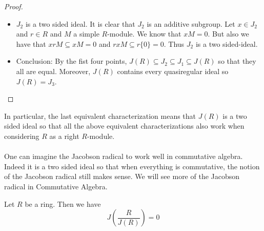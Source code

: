 \documentclass[a4paper]{article}
\begin{document}
\begin{thm}{}{}
\begin{proof}
\begin{itemize}
\item $J_2$ is a two sided ideal. It is clear that $J_2$ is an additive subgroup. Let $x\in J_2$ and $r\in R$ and $M$ a simple $R$-module. We know that $xM=0$. But also we have that $xrM\subseteq xM=0$ and $rxM\subseteq r\{0\}=0$. Thus $J_2$ is a two sided-ideal. 

\item Conclusion: By the fist four points, $J(R)\subseteq J_2\subseteq J_1\subseteq J(R)$ so that they all are equal. Moreover, $J(R)$ contains every quasiregular ideal so $J(R)=J_3$. 
\end{itemize}
\end{proof}
\end{thm}

In particular, the last equivalent characterization means that $J(R)$ is a two sided ideal so that all the above equivalent characterizations also work when considering $R$ as a right $R$-module. \\~\\

One can imagine the Jacobson radical to work well in commutative algebra. Indeed it is a two sided ideal so that when everything is commutative, the notion of the Jacobson radical still makes sense. We will see more of the Jacobson radical in Commutative Algebra. 

\begin{lmm}{}{} Let $R$ be a ring. Then we have $$J\left(\frac{R}{J(R)}\right)=0$$
\end{lmm}
\end{document}
